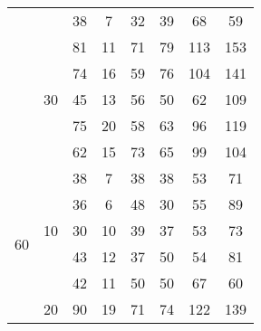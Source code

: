 \begin{table}[h]
\begin{tabular}{cc|c|c|c|c|c|c|}
\multicolumn{1}{|c|}{}                     &                     & 38              & 7             & 32              & 39            & 68              & 59            \\ \cline{2-8} 
\multicolumn{1}{|c|}{}                     & \multirow{5}{*}{30} & 81              & 11            & 71              & 79            & 113             & 153           \\ \cline{3-8} 
\multicolumn{1}{|c|}{}                     &                     & 74              & 16            & 59              & 76            & 104             & 141           \\ \cline{3-8} 
\multicolumn{1}{|c|}{}                     &                     & 45              & 13            & 56              & 50            & 62              & 109           \\ \cline{3-8} 
\multicolumn{1}{|c|}{}                     &                     & 75              & 20            & 58              & 63            & 96              & 119           \\ \cline{3-8} 
\multicolumn{1}{|c|}{}                     &                     & 62              & 15            & 73              & 65            & 99              & 104           \\ \hline
\multicolumn{1}{|c|}{\multirow{15}{*}{60}} & \multirow{5}{*}{10} & 38              & 7             & 38              & 38            & 53              & 71            \\ \cline{3-8} 
\multicolumn{1}{|c|}{}                     &                     & 36              & 6             & 48              & 30            & 55              & 89            \\ \cline{3-8} 
\multicolumn{1}{|c|}{}                     &                     & 30              & 10            & 39              & 37            & 53              & 73            \\ \cline{3-8} 
\multicolumn{1}{|c|}{}                     &                     & 43              & 12            & 37              & 50            & 54              & 81            \\ \cline{3-8} 
\multicolumn{1}{|c|}{}                     &                     & 42              & 11            & 50              & 50            & 67              & 60            \\ \cline{2-8} 
\multicolumn{1}{|c|}{}                     & \multirow{5}{*}{20} & 90              & 19            & 71              & 74            & 122             & 139           \\ \cline{3-8} 

\end{tabular}
\end{table}
